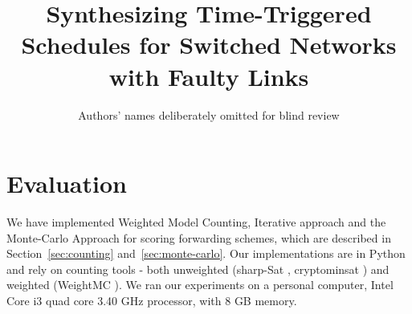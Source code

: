 \documentclass{sig-alternate-05-2015}[9pt]
\theoremstyle{definition}
\begin{document}






	\title{Synthesizing Time-Triggered Schedules for Switched Networks with Faulty Links}
	\author{Authors' names deliberately omitted for blind review}




	\maketitle


\section{Evaluation}
	\label{sec:eval}
	We have implemented Weighted Model Counting, Iterative approach and the Monte-Carlo Approach for scoring forwarding schemes, which are described in Section~\ref{sec:counting} and~\ref{sec:monte-carlo}. Our implementations are in Python and rely on counting tools - both unweighted (sharp-Sat \cite{sharpSat}, cryptominsat \cite{cryptominsat}) and weighted (WeightMC \cite{WeightMC}). We ran our experiments on a personal computer, Intel Core i3 quad core 3.40 GHz processor, with 8 GB memory.
\end{document}
